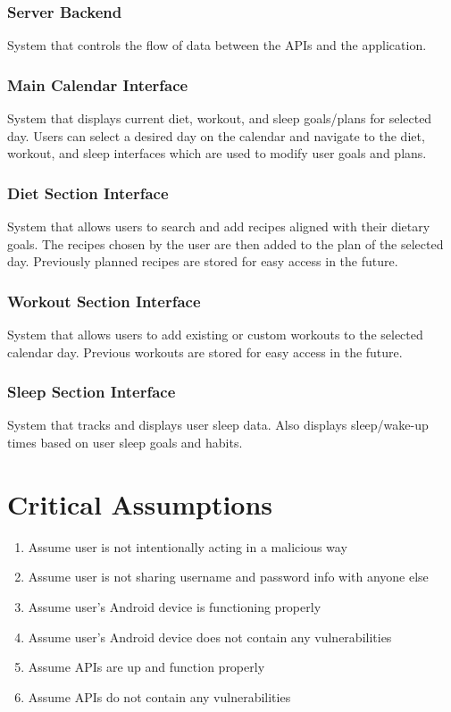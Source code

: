 \documentclass{article}
\begin{document}
\subsubsection{Server Backend}
\noindent System that controls the flow of data between the APIs and the application.

\subsubsection{Main Calendar Interface}
\noindent System that displays current diet, workout, and sleep goals/plans for selected day. Users can select a desired day on the calendar and navigate to the diet, workout, and sleep interfaces which are used to modify user goals and plans.

\subsubsection{Diet Section Interface}
\noindent System that allows users to search and add recipes aligned with their dietary goals. The recipes chosen by the user are then added to the plan of the selected day. Previously planned recipes are stored for easy access in the future.

\subsubsection{Workout Section Interface}
\noindent System that allows users to add existing or custom workouts to the selected calendar day. Previous workouts are stored for easy access in the future. 

\subsubsection{Sleep Section Interface}
\noindent System that tracks and displays user sleep data. Also displays sleep/wake-up times based on user sleep goals and habits. 

\section{Critical Assumptions}
\noindent 
\begin{enumerate}
	\item Assume user is not intentionally acting in a malicious way
	\item Assume user is not sharing username and password info with anyone else
	\item Assume user's Android device is functioning properly
	\item Assume user's Android device does not contain any vulnerabilities
	\item Assume APIs are up and function properly
	\item Assume APIs do not contain any vulnerabilities
\end{enumerate}
\end{document}
